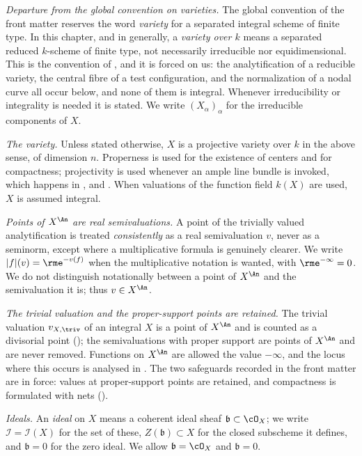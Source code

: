 \emph{Departure from the global convention on varieties.}  The global
convention of the front matter reserves the word \emph{variety} for a
separated integral scheme of finite type.  In this chapter, and in
 generally, a
\emph{variety over $k$} means a separated reduced $k$-scheme of finite
type, not necessarily irreducible nor equidimensional.  This is the
convention of \cite{BJ22}, and it is forced on us: the analytification of a
reducible variety, the central fibre of a test configuration, and the
normalization of a nodal curve all occur below, and none of them is integral.
Whenever irreducibility or integrality is needed it is stated.  We write
$(X_\alpha)_\alpha$ for the irreducible components of $X$.

\emph{The variety.}  Unless stated otherwise, $X$ is a projective variety
over $k$ in the above sense, of dimension $n$.  Properness is used for
the existence of centers and for compactness; projectivity is used whenever
an ample line bundle is invoked, which happens in
,
 and
.  When valuations of the function
field $k(X)$ are used, $X$ is assumed integral.

\emph{Points of $X^{\An}$ are real semivaluations.}  A point of the
trivially valued analytification is treated \emph{consistently} as a real
semivaluation $v$, never as a seminorm, except where a multiplicative
formula is genuinely clearer.  We write $|f|(v)=\rme^{-v(f)}$ when the
multiplicative notation is wanted, with $\rme^{-\infty}=0$.  We do not
distinguish notationally between a point of $X^{\An}$ and the
semivaluation it is; thus $v\in X^{\An}$.

\emph{The trivial valuation and the proper-support points are retained.}
The trivial valuation $v_{X,\triv}$ of an integral $X$ is a point of
$X^{\An}$ and is counted as a divisorial point
(); the semivaluations with proper support are
points of $X^{\An}$ and are never removed.  Functions on $X^{\An}$ are
allowed the value $-\infty$, and the locus where this occurs is analysed
in .  The two safeguards recorded in the
front matter are in force: values at proper-support points are retained,
and compactness is formulated with nets ().

\emph{Ideals.}  An \emph{ideal} on $X$ means a coherent ideal sheaf
$\mathfrak b\subset\cO_X$; we write $\mathcal I=\mathcal I(X)$ for the
set of these, $Z(\mathfrak b)\subset X$ for the closed subscheme it
defines, and $\mathfrak b=0$ for the zero ideal.  We allow
$\mathfrak b=\cO_X$ and $\mathfrak b=0$.

